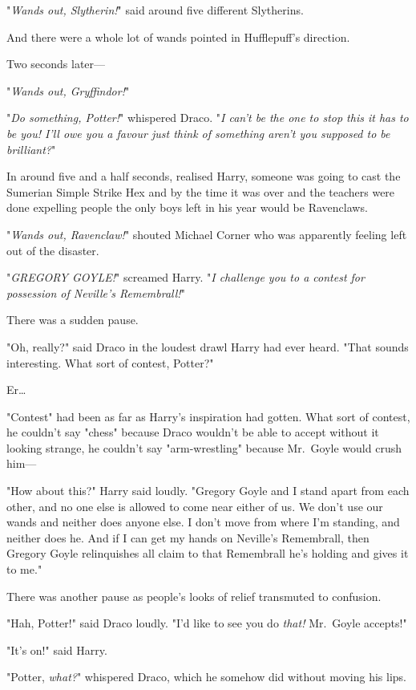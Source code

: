 "\emph{Wands out, Slytherin!}" said around five different Slytherins.

And there were a whole lot of wands pointed in Hufflepuff's direction.

Two seconds later---

"\emph{Wands out, Gryffindor!}"

"\emph{Do something, Potter!}" whispered Draco. "\emph{I can't be the one to
stop this it has to be you! I'll owe you a favour just think of something
aren't you supposed to be brilliant?}"

In around five and a half seconds, realised Harry, someone was going to cast
the Sumerian Simple Strike Hex and by the time it was over and the teachers
were done expelling people the only boys left in his year would be Ravenclaws.

"\emph{Wands out, Ravenclaw!}" shouted Michael Corner who was apparently
feeling left out of the disaster.

"\emph{GREGORY GOYLE!}" screamed Harry. "\emph{I challenge you to a contest for
possession of Neville's Remembrall!}"

There was a sudden pause.

"Oh, really?" said Draco in the loudest drawl Harry had ever heard. "That
sounds interesting. What sort of contest, Potter?"

Er{\ldots}

"Contest" had been as far as Harry's inspiration had gotten. What sort of
contest, he couldn't say "chess" because Draco wouldn't be able to accept
without it looking strange, he couldn't say "arm-wrestling" because Mr.~Goyle
would crush him---

"How about this?" Harry said loudly. "Gregory Goyle and I stand apart from each
other, and no one else is allowed to come near either of us. We don't use our
wands and neither does anyone else. I don't move from where I'm standing, and
neither does he. And if I can get my hands on Neville's Remembrall, then
Gregory Goyle relinquishes all claim to that Remembrall he's holding and gives
it to me."

There was another pause as people's looks of relief transmuted to confusion.

"Hah, Potter!" said Draco loudly. "I'd like to see you do \emph{that!}
Mr.~Goyle accepts!"

"It's on!" said Harry.

"Potter, \emph{what?}" whispered Draco, which he somehow did without moving his
lips.

